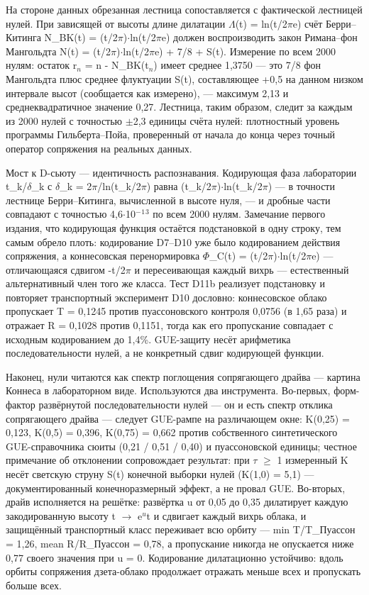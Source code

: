\documentclass[11pt,a4paper]{article}
\begin{document}
На стороне данных обрезанная лестница сопоставляется с фактической лестницей нулей. При зависящей от высоты длине дилатации $\Lambda$(t) = ln(t/2$\pi$e) счёт Берри--Китинга N\_\allowbreak{}BK(t) = (t/2$\pi$)$\cdot$ln(t/2$\pi$e) должен воспроизводить закон Римана--фон Мангольдта N(t) = (t/2$\pi$)$\cdot$ln(t/2$\pi$e) + 7/8 + S(t). Измерение по всем 2000 нулям: остаток r$_{n}$ = n - N\_\allowbreak{}BK(t$_{n}$) имеет среднее 1,3750 --- это 7/8 фон Мангольдта плюс среднее флуктуации S(t), составляющее +0,5 на данном низком интервале высот (сообщается как измерено), --- максимум 2,13 и среднеквадратичное значение 0,27. Лестница, таким образом, следит за каждым из 2000 нулей с точностью $\pm$2,3 единицы счёта нулей: плотностный уровень программы Гильберта--Пойа, проверенный от начала до конца через точный оператор сопряжения на реальных данных.

Мост к D-сьюту --- идентичность распознавания. Кодирующая фаза лаборатории t\_\allowbreak{}k/$\delta$\_\allowbreak{}k с $\delta$\_\allowbreak{}k = 2$\pi$/ln(t\_\allowbreak{}k/2$\pi$) равна (t\_\allowbreak{}k/2$\pi$)$\cdot$ln(t\_\allowbreak{}k/2$\pi$) --- в точности лестнице Берри--Китинга, вычисленной в высоте нуля, --- и дробные части совпадают с точностью 4,6$\cdot$10$^{-}$$^{1}$$^{3}$ по всем 2000 нулям. Замечание первого издания, что кодирующая функция остаётся подстановкой в одну строку, тем самым обрело плоть: кодирование D7--D10 уже было кодированием действия сопряжения, а коннесовская перенормировка $\Phi$\_\allowbreak{}C(t) = (t/2$\pi$)$\cdot$ln(t/2$\pi$e) --- отличающаяся сдвигом -t/2$\pi$ и пересеивающая каждый вихрь --- естественный альтернативный член того же класса. Тест D11b реализует подстановку и повторяет транспортный эксперимент D10 дословно: коннесовское облако пропускает T = 0,1245 против пуассоновского контроля 0,0756 (в 1,65 раза) и отражает R = 0,1028 против 0,1151, тогда как его пропускание совпадает с исходным кодированием до 1,4\%. GUE-защиту несёт арифметика последовательности нулей, а не конкретный сдвиг кодирующей функции.

Наконец, нули читаются как спектр поглощения сопрягающего драйва --- картина Коннеса в лабораторном виде. Используются два инструмента. Во-первых, форм-фактор развёрнутой последовательности нулей --- он и есть спектр отклика сопрягающего драйва --- следует GUE-рампе на различающем окне: K(0,25) = 0,123, K(0,5) = 0,396, K(0,75) = 0,662 против собственного синтетического GUE-справочника сюиты (0,21 / 0,51 / 0,40) и пуассоновской единицы; честное примечание об отклонении сопровождает результат: при $\tau$ $\ge$ 1 измеренный K несёт светскую струну S(t) конечной выборки нулей (K(1,0) = 5,1) --- документированный конечноразмерный эффект, а не провал GUE. Во-вторых, драйв исполняется на решётке: развёртка u от 0,05 до 0,35 дилатирует каждую закодированную высоту t $\to$ e$^{u}$t и сдвигает каждый вихрь облака, и защищённый транспортный класс переживает всю орбиту --- min T/T\_\allowbreak{}Пуассон = 1,26, mean R/R\_\allowbreak{}Пуассон = 0,78, а пропускание никогда не опускается ниже 0,77 своего значения при u = 0. Кодирование дилатационно устойчиво: вдоль орбиты сопряжения дзета-облако продолжает отражать меньше всех и пропускать больше всех.
\end{document}
